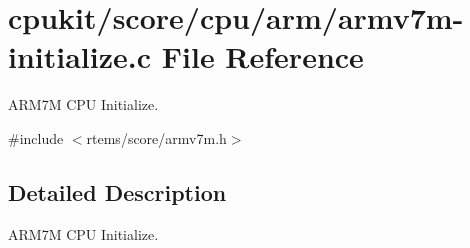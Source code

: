 \hypertarget{armv7m-initialize_8c}{}\section{cpukit/score/cpu/arm/armv7m-\/initialize.c File Reference}
\label{armv7m-initialize_8c}


A\+R\+M7M C\+PU Initialize.  


{\ttfamily \#include $<$rtems/score/armv7m.\+h$>$}\newline


\subsection{Detailed Description}
A\+R\+M7M C\+PU Initialize. 


